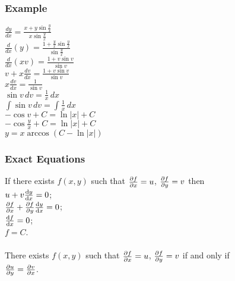 \documentclass{article}
\begin{document}
			\subsubsection*{Example}
				$\frac{dy}{dx} = \frac{x + y\sin{\frac{y}{x}}}{x\sin{\frac{y}{x}}}$ \\
				$\frac{d}{dx}(y) = \frac{1 + \frac{y}{x}\sin{\frac{y}{x}}}{\sin{\frac{y}{x}}}$ \\
				$\frac{d}{dx}(xv) = \frac{1 + v\sin{v}}{\sin{v}}$ \\
				$v + x\frac{dv}{dx} = \frac{1 + v\sin{v}}{\sin{v}}$ \\
				$x\frac{dv}{dx} = \frac{1}{\sin{v}}$ \\
				$\sin{v} \,dv = \frac{1}{x} \,dx$ \\
				$\int \sin{v} \,dv = \int \frac{1}{x} \,dx$ \\
				$-\cos{v} + C = \ln{|x|} + C$ \\
				$-\cos{\frac{y}{x}} + C = \ln{|x|} + C$ \\
				$y= x\arccos{(C - \ln{|x|})}$ \\
	
			\subsubsection{Exact Equations}
				If there exists $f(x,y)$ such that $\pdv{f}{x} = u$, $\pdv{f}{y} = v$ then \\
				$u + v\dv{y}{x} = 0$; \\
				$\pdv{f}{x} + \pdv{f}{y}\dv{y}{x} = 0$; \\
				$\dv{f}{x} = 0$; \\
				$f = C$. \\
				\\
				There exists $f(x,y)$ such that $\pdv{f}{x} = u$, $\pdv{f}{y} = v$ if and only if \\
				$\pdv{u}{y} = \pdv{v}{x}$. \\
	
\end{document}
